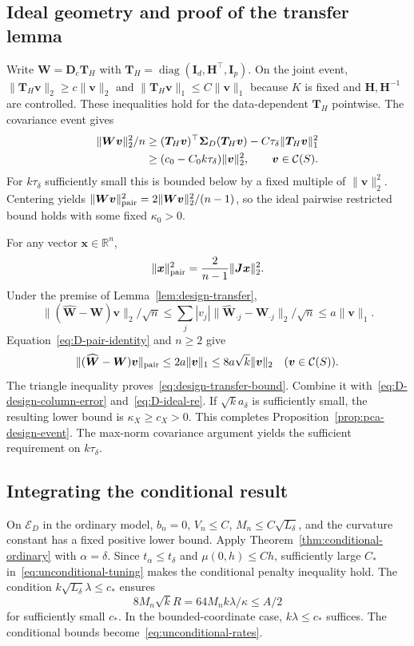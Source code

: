 \subsection{Ideal geometry and proof of the transfer lemma}
\label{subapp:re-transfer-proof}
Write $\bm{W}=\bm{D}_c\bm{T}_H$ with $\bm{T}_H=\operatorname{diag}(\bm{I}_d,\bm{H}^\top,\bm{I}_p)$. On the joint event, $\|\bm{T}_H\bm{v}\|_2\ge c\|\bm{v}\|_2$ and $\|\bm{T}_H\bm{v}\|_1\le C\|\bm{v}\|_1$ because $K$ is fixed and $\bm{H},\bm{H}^{-1}$ are controlled. These inequalities hold for the data-dependent $\bm{T}_H$ pointwise. The covariance event gives
\begin{align}
 \|\bm{W}\bm{v}\|_2^2/n
 &\ge (\bm{T}_H\bm{v})^\top\bm{\Sigma}_D(\bm{T}_H\bm{v})-C\tau_\delta\|\bm{T}_H\bm{v}\|_1^2\notag\\
 &\ge(c_0-C_0k\tau_\delta)\|\bm{v}\|_2^2,
       \qquad \bm{v}\in\mathcal C(S).
 \label{eq:D-ideal-re}
\end{align}
For $k\tau_\delta$ sufficiently small this is bounded below by a fixed multiple of $\|\bm{v}\|_2^2$. Centering yields $\|\bm{W}\bm{v}\|_{\rm pair}^2=2\|\bm{W}\bm{v}\|_2^2/(n-1)$, so the ideal pairwise restricted bound holds with some fixed $\kappa_0>0$.

For any vector $\bm{x}\in\mathbb R^n$,
\begin{equation}
 \|\bm{x}\|_{\rm pair}^2=\frac{2}{n-1}\|\bm{J}\bm{x}\|_2^2.
 \label{eq:D-pair-identity}
\end{equation}
Under the premise of Lemma~\ref{lem:design-transfer},
\[
 \|(\widehat{\bm{W}}-\bm{W})\bm{v}\|_2/\sqrt n
 \le\sum_j|v_j|\|\widehat{\bm{W}}_{\cdot j}-\bm{W}_{\cdot j}\|_2/\sqrt n
 \le a\|\bm{v}\|_1.
\]
Equation~\eqref{eq:D-pair-identity} and $n\ge2$ give
\[
 \|(\widehat{\bm{W}}-\bm{W})\bm{v}\|_{\rm pair}\le2a\|\bm{v}\|_1
       \le8a\sqrt{k}\|\bm{v}\|_2\quad (\bm{v}\in\mathcal C(S)).
\]
The triangle inequality proves~\eqref{eq:design-transfer-bound}. Combine it with~\eqref{eq:D-design-column-error} and~\eqref{eq:D-ideal-re}. If $\sqrt{k}a_\delta$ is sufficiently small, the resulting lower bound is $\kappa_X\ge c_X>0$. This completes Proposition~\ref{prop:pca-design-event}. The max-norm covariance argument yields the sufficient requirement on $k\tau_\delta$.

\subsection{Integrating the conditional result}
\label{subapp:unconditional-proof}
On $\mathcal E_D$ in the ordinary model, $b_n=0$, $V_n\le C$, $M_n\le C\sqrt{L_\delta}$, and the curvature constant has a fixed positive lower bound. Apply Theorem~\ref{thm:conditional-ordinary} with $\alpha=\delta$. Since $t_\alpha\le t_\delta$ and $\mu(0,h)\le Ch$, sufficiently large $C_*$ in~\eqref{eq:unconditional-tuning} makes the conditional penalty inequality hold. The condition $k\sqrt{L_\delta}\lambda\le c_*$ ensures
\[
 8M_n\sqrt{k}R=64M_nk\lambda/\kappa\le A/2
\]
for sufficiently small $c_*$. In the bounded-coordinate case, $k\lambda\le c_*$ suffices. The conditional bounds become~\eqref{eq:unconditional-rates}.


